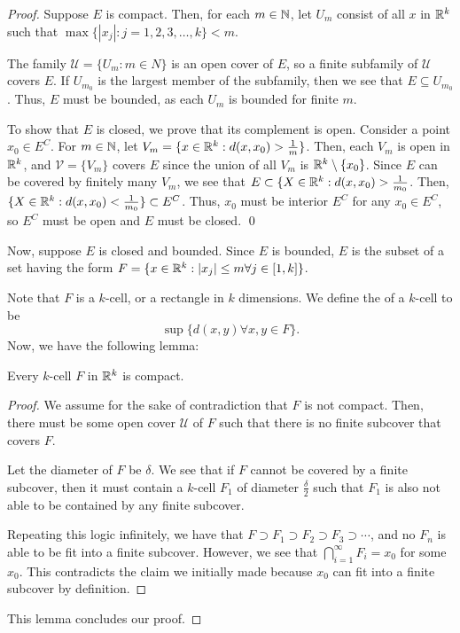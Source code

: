 \documentclass{book}
\begin{document}
\begin{proof}
    Suppose $E$ is compact. Then, for each $m \in \mathbb{N}$, let $U_m$ consist of all $x$ in $\mathbb{R}^k$ such that $\max \{|x_j| : j = 1,2,3,\ldots, k\} < m$.

    The family $\mathcal{U} = \{U_m : m \in N\}$ is an open cover of $E$, so a finite subfamily of $\mathcal{U}$ covers $E$. If $U_{m_0}$ is the largest member of the subfamily, then we see that $E \subseteq U_{m_0}$. Thus, $E$ must be bounded, as each $U_m$ is bounded for finite $m$.

    To show that $E$ is closed, we prove that its complement is open. Consider a point $x_0 \in E^C$. For $m \in \mathbb{N}$, let $V_m = \{x \in \mathbb{R}^k : d(x, x_0) > \frac{1}{m}\}$. Then, each $V_m$ is open in $\mathbb{R}^k$, and $\mathcal{V} = \{V_m\}$ covers $E$ since the union of all $V_m$ is $\mathbb{R}^k \setminus \{x_0\}$. Since $E$ can be covered by finitely many $V_m$, we see that $E \subset \{X \in \mathbb{R}^k: d(x, x_0) > \frac{1}{m_0}$. Then, $\{X \in \mathbb{R}^k: d(x, x_0) < \frac{1}{m_0}\} \subset E^C$. Thus, $x_0$ must be interior $E^C$ for any $x_0 \in E^C$, so $E^C$ must be open and $E$ must be closed. \qed

    Now, suppose $E$ is closed and bounded. Since $E$ is bounded, $E$ is the subset of a set having the form $F = \{x \in \mathbb{R}^k : |x_j| \leq m \forall j \in [1, k]\}$. 

    Note that $F$ is a $k$-cell, or a rectangle in $k$ dimensions. We define the  of a $k$-cell to be \[\sup \{d(x, y) \forall x, y \in F\}.\] Now, we have the following lemma:

    \begin{lemma}
        Every $k$-cell $F$ in $\mathbb{R}^k$ is compact.
    \end{lemma}

    \begin{proof}
        We assume for the sake of contradiction that $F$ is not compact. Then, there must be some open cover $\mathcal{U}$ of $F$ such that there is no finite subcover that covers $F$.

        Let the diameter of $F$ be $\delta$. We see that if $F$ cannot be covered by a finite subcover, then it must contain a $k$-cell $F_1$ of diameter $\frac \delta 2$ such that $F_1$ is also not able to be contained by any finite subcover.

        Repeating this logic infinitely, we have that $F \supset F_1 \supset F_2 \supset F_3 \supset \cdots$, and no $F_n$ is able to be fit into a finite subcover. However, we see that $\bigcap_{i = 1}^\infty F_i = x_0$ for some $x_0$. This contradicts the claim we initially made because $x_0$ can fit into a finite subcover by definition.
    \end{proof}

    This lemma concludes our proof.
\end{proof}
\end{document}
